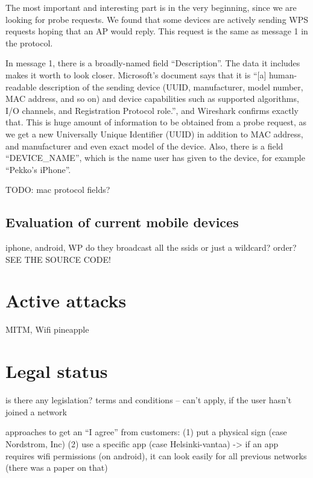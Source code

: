 \documentclass[12pt,a4paper,oneside,pdftex]{report}
\begin{document}
The most important and interesting part is in the very beginning, since we are looking for probe requests. We found that some devices are actively sending WPS requests hoping that an AP would reply. This request is the same as message 1 in the protocol.

In message 1, there is a broadly-named field ``Description''. The data it includes makes it worth to look closer. Microsoft's document says that it is ``[a] human-readable description of the sending device (UUID, manufacturer, model number, MAC address, and so on) and device capabilities such as supported algorithms, I/O channels, and Registration Protocol role.'', and Wireshark confirms exactly that. This is huge amount of information to be obtained from a probe request, as we get a new Universally Unique Identifier (UUID) in addition to MAC address, and manufacturer and even exact model of the device. Also, there is a field ``DEVICE\_NAME'', which is the name user has given to the device, for example ``Pekko's iPhone''.

TODO: mac protocol fields?

\section{Evaluation of current mobile devices}
\label{subsec:evaluation}
iphone, android, WP
do they broadcast all the ssids or just a wildcard?
order? SEE THE SOURCE CODE!




\chapter{Active attacks}
\label{chapter:attacks}

MITM, Wifi pineapple




\chapter{Legal status}
\label{chapter:legal}

is there any legislation? terms and conditions -- can't apply, if the user hasn't joined a network

approaches to get an ``I agree'' from customers: 
(1) put a physical sign (case Nordstrom, Inc) 
(2) use a specific app (case Helsinki-vantaa)
    -> if an app requires wifi permissions (on android), it can look easily for all previous networks (there was a paper on that)
\end{document}
